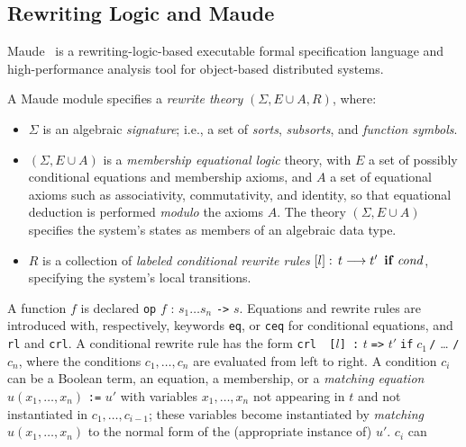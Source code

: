 \subsection{Rewriting Logic and Maude}

Maude~\cite{maude-book} is a rewriting-logic-based executable formal specification language and
high-performance analysis tool for object-based distributed systems.

A Maude module specifies a 
 \emph{rewrite theory} $(\Sigma, E\cup A,  R)$, where:
\begin{itemize}
\item $\Sigma$ is an algebraic \emph{signature}; i.e., a set of 
\emph{sorts}, \emph{subsorts}, and \emph{function
    symbols}.  
\item $(\Sigma, E\cup A)$ is a \emph{membership equational
logic}
theory,  with  $E$ a set of possibly conditional 
equations and membership axioms,  and
$A$ a set of equational axioms such as 
associativity, commutativity, and identity, so that equational
deduction is performed \emph{modulo} the axioms $A$. 
The theory $(\Sigma, E\cup A)$
specifies
the system's states as members of an algebraic data type.
\item $R$
is a collection of {\em labeled conditional rewrite rules\/} \( [l]:\,
t\longrightarrow t'\,\mbox{ \bf if } \mathit{cond}\), specifying  
the system's local transitions. 
\end{itemize}
A function $f$ is  declared \texttt{op} $f$ : \(s_1\ldots s_n\)
\texttt{->} $s$.
Equations and rewrite rules are introduced with, respectively,
keywords {\tt eq}, or  {\tt ceq}  for 
conditional equations, and 
{\tt rl} and {\tt crl}.
A conditional rewrite rule has the form \texttt{crl\,\,[}$l$\texttt{]\,:}
$t\;$\texttt{=>}$\,\,t'\;$\texttt{if}$\;c_1\,$\texttt{/} \ldots
\texttt{/} $c_n$, where the  conditions $c_1,
\ldots, c_n$ are evaluated from left to right. A condition $c_i$ can be a
Boolean term, an equation, a membership, or a
\emph{matching equation} $u(x_1, \ldots, x_n)\,\,$\texttt{:=}$\,\,u'$
with  variables $x_1, \ldots, x_n$ not appearing in $t$ and not
instantiated in $c_1, \ldots, c_{i-1}$; these variables become
instantiated by \emph{matching} $u(x_1, \ldots, x_n)$ to the normal
form of the (appropriate  instance of) $u'$. $c_i$ can
